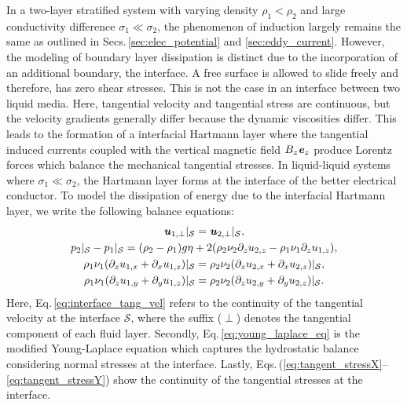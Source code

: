 \documentclass[aps,prfluids,reprint,superscriptaddress]{revtex4-2}
\newcommand{\h}[1]{\textbf{\textit{#1}}}
\begin{document}
In a two-layer stratified system with varying density $\rho_1 < \rho_2$ and large conductivity difference $\sigma_1\ll\sigma_2$, the phenomenon of induction largely remains the same as outlined in Secs.\,\ref{sec:elec_potential} and \ref{sec:eddy_current}. However, the modeling of boundary layer dissipation is distinct due to the incorporation of an additional boundary, the interface. A free surface is allowed to slide freely and therefore, has zero shear stresses. This is not the case in an interface between two liquid media. Here, tangential velocity and tangential stress are continuous, but the velocity gradients generally differ
because the dynamic viscosities differ. This leads to the formation of a interfacial Hartmann layer where the tangential induced currents coupled with the vertical magnetic field $B_z\h e_z$ produce Lorentz forces which balance the mechanical tangential stresses. In liquid-liquid systems where $\sigma_1\ll\sigma_2$, the Hartmann layer forms at the interface of the better electrical conductor. To model the dissipation of energy due to the interfacial Hartmann layer, we write the following balance equations:
\begin{subequations}
	\begin{gather}
		\h u_{1,\perp}|_{\mathcal S} = \h u_{2,\perp}|_{\mathcal S},
		\label{eq:interface_tang_vel}
		\\
		p_2|_{\mathcal S} - p_1|_{\mathcal S} =
		(\rho_2-\rho_1)g\eta + 2(\rho_2\nu_2\partial_z u_{2,z} - \rho_1\nu_1\partial_z u_{1,z}),
		\label{eq:young_laplace_eq}
		\\
		\rho_1\nu_1(\partial_z u_{1,x} + \partial_x u_{1,z})|_{\mathcal S}
		=
		\rho_2\nu_2(\partial_z u_{2,x} + \partial_x u_{2,z})|_{\mathcal S},
		\label{eq:tangent_stressX}
		\\
		\rho_1\nu_1(\partial_z u_{1,y} + \partial_y u_{1,z})|_{\mathcal S}
		=
		\rho_2\nu_2(\partial_z u_{2,y} + \partial_y u_{2,z})|_{\mathcal S}.
		\label{eq:tangent_stressY}
	\end{gather}
\end{subequations}
Here, Eq.\,\eqref{eq:interface_tang_vel} refers to the continuity of the tangential velocity at the interface $\mathcal{S}$, where the suffix ($\perp$) denotes the tangential component of each fluid layer. Secondly, Eq.\,\eqref{eq:young_laplace_eq} is the modified Young-Laplace equation which captures the hydrostatic balance considering normal stresses at the interface. Lastly, Eqs.\,(\ref{eq:tangent_stressX}--\ref{eq:tangent_stressY}) show the continuity of the tangential stresses at the interface. 
\end{document}
